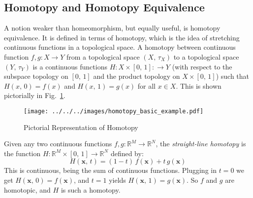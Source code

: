 \documentclass{article}
\theoremstyle{plain}
\theoremstyle{normal}
\newenvironment{example}{%
    \pushQED{\qed}\renewcommand{\qedsymbol}{$\blacksquare$}\examplex%
}{%
    \popQED\endexamplex%
}
\newenvironment{definition}{%
    \pushQED{\qed}\renewcommand{\qedsymbol}{$\blacksquare$}\definitionx%
}{%
    \popQED\enddefinitionx%
}
\begin{document}
        \subsection{Homotopy and Homotopy Equivalence}
            A notion weaker than homeomorphism, but equally useful, is
            homotopy equivalence.
            It is defined in terms of homotopy, which is
            the idea of stretching continuous functions in a topological space.
            \begin{definition}[Homotopy]
                A homotopy between continuous function
                $f,g:X\rightarrow{Y}$ from a topological space $(X,\,\tau_{X})$
                to a topological space $(Y,\,\tau_{Y})$ is a continuous
                functions $H:X\times[0,\,1]:\rightarrow{Y}$
                (with respect to the subspace topology on $[0,\,1]$ and the
                product topology on $X\times[0,\,1]$) such that
                $H(x,\,0)=f(x)$ and $H(x,\,1)=g(x)$ for all $x\in{X}$.%
            \end{definition}
            This is shown pictorially in Fig.~\ref{fig:homotopy_basic_example}.
            \begin{figure}
                \centering
                \texttt{[image: ../../../images/homotopy\_basic\_example.pdf]}
                \caption{Pictorial Representation of Homotopy}
                \label{fig:homotopy_basic_example}
            \end{figure}
            \begin{example}
                Given any two continuous functions
                $f,g:\mathbb{R}^{M}\rightarrow\mathbb{R}^{N}$, the
                \textit{straight-line homotopy}%
                is the function
                $H:\mathbb{R}^{M}\times[0,\,1]\rightarrow\mathbb{R}^{N}$
                defined by:
                \begin{equation}
                    H(\mathbf{x},\,t)=
                    (1-t)\,f(\mathbf{x})+t\,g(\mathbf{x})
                \end{equation}
                This is continuous, being the sum of continuous functions.
                Plugging in $t=0$ we get $H(\mathbf{x},\,0)=f(\mathbf{x})$,
                and $t=1$ yields $H(\mathbf{x},\,1)=g(\mathbf{x})$. So
                $f$ and $g$ are homotopic, and $H$ is such a homotopy.
            \end{example}
\end{document}
